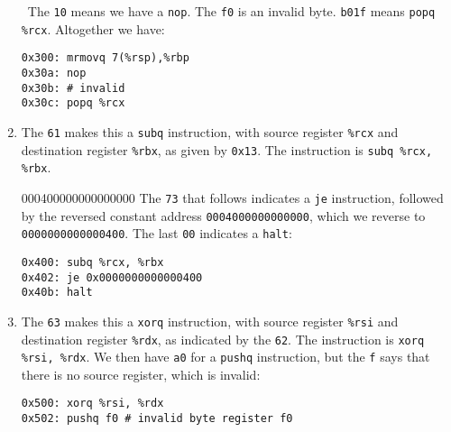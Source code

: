 \documentclass[12pt]{article}
\newenvironment{sol}[1][Solution]{\begin{trivlist}
		\item[\hskip \labelsep {\bfseries #1:}]}{\end{trivlist}}
\begin{document}
\begin{sol}
\begin{enumerate}[label=(\alph*)]
		\
		The \texttt{10} means we have a \texttt{nop}. The \texttt{f0}
		is an invalid byte. \texttt{b01f} means \texttt{popq} \texttt{\%rcx}.
		Altogether we have:
		\begin{lstlisting}[language={}]
0x300: mrmovq 7(%rsp),%rbp
0x30a: nop
0x30b: # invalid
0x30c: popq %rcx
		\end{lstlisting}
		
	
		\item The \texttt{61} makes this a \texttt{subq} instruction,
		with source register \texttt{\%rcx} and destination register
		\texttt{\%rbx}, as given by \texttt{0x13}. The instruction is
		\texttt{subq \%rcx, \%rbx}.
		
		000400000000000000
		The \texttt{73} that follows indicates a \texttt{je} instruction,
		followed by the reversed constant address \texttt{0004000000000000},
		which we reverse to \texttt{0000000000000400}. The last \texttt{00}
		indicates a \texttt{halt}:
		\begin{lstlisting}[language={}]
0x400: subq %rcx, %rbx
0x402: je 0x0000000000000400
0x40b: halt
		\end{lstlisting}
		\item The \texttt{63} makes this a \texttt{xorq} instruction,
		with source register \texttt{\%rsi} and destination register
		\texttt{\%rdx}, as indicated by the \texttt{62}. The instruction
		is \texttt{xorq \%rsi, \%rdx}. We then have \texttt{a0} for
		a \texttt{pushq} instruction, but the \texttt{f} says that
		there is no source register, which is invalid:
		\begin{lstlisting}[language={}]
0x500: xorq %rsi, %rdx
0x502: pushq f0 # invalid byte register f0
		\end{lstlisting}
	\end{enumerate}
\end{sol}
\end{document}
